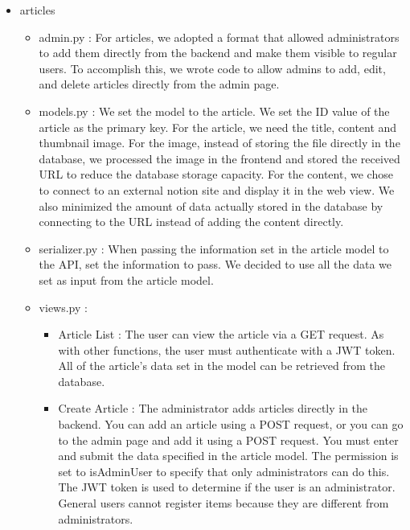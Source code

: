 \documentclass[conference, a4paper]{IEEEtran}
\begin{document}
\begin{enumerate}
\begin{itemize}
    \item articles
    \begin{itemize}
        \item admin.py : For articles, we adopted a format that allowed administrators to add them directly from the backend and make them visible to regular users. To accomplish this, we wrote code to allow admins to add, edit, and delete articles directly from the admin page.\\
        \item models.py : We set the model to the article. We set the ID value of the article as the primary key. For the article, we need the title, content and thumbnail image. For the image, instead of storing the file directly in the database, we processed the image in the frontend and stored the received URL to reduce the database storage capacity. For the content, we chose to connect to an external notion site and display it in the web view. We also minimized the amount of data actually stored in the database by connecting to the URL instead of adding the content directly. \\
        \item serializer.py : When passing the information set in the article model to the API, set the information to pass. We decided to use all the data we set as input from the article model. \\
        \item views.py : 
        \begin{itemize}
            \item Article List : The user can view the article via a GET request. As with other functions, the user must authenticate with a JWT token. All of the article's data set in the model can be retrieved from the database.
            \item Create Article : The administrator adds articles directly in the backend. You can add an article using a POST request, or you can go to the admin page and add it using a POST request. You must enter and submit the data specified in the article model. The permission is set to isAdminUser to specify that only administrators can do this. The JWT token is used to determine if the user is an administrator. General users cannot register items because they are different from administrators.
        \end{itemize}
    \end{itemize}


\end{itemize}
\end{enumerate}
\end{document}
